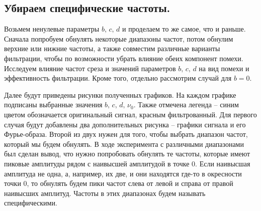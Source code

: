 \documentclass[a4paper, 12pt]{article}
\begin{document}
    \subsection{Убираем специфические частоты.}
    Возьмем ненулевые параметры $b,\,c,\,d$ и проделаем то же самое, что и раньше. Сначала попробуем
    обнулять некоторые диапазоны частот, потом обнулим верхние или нижние частоты, а также
    совместим различные варианты фильтрации, чтобы по возможности убрать влияние обеих компонент помехи.
    Исследуем влияние частот среза и значений параметров $b,\,c,\,d$ на вид помехи и эффективность
    фильтрации. Кроме того, отдельно рассмотрим случай для $b=0$.


    Далее будут приведены рисунки полученных графиков. На каждом графике подписаны выбранные значения $b,\,c,\,d,\,\nu_0$. 
    Также отмечена легенда -- синим цветом обозначается оригинальный сигнал, красным фильтрованный. Для первого случая будут
    добавлены два дополнительных рисунка -- графики сигнала и его Фурье-образа. Второй из двух нужен для того, чтобы выбрать
    диапазон частот, который мы будем обнулять. В ходе эксперимента с различными диапазонами был сделан вывод, что нужно попробовать
    обнулять те частоты, которые имеют пиковые амплитуды рядом с наивысшей амплитудой в точке 0. Если наивысшая амплитуда не одна, а, например,
    их две, и они находятся где-то в окресности точки 0, то обнулять будем пики частот слева от левой и справа от правой наивысших амплитуд.
    Частоты в этих диапазонах будем называть специфическими.
\end{document}
